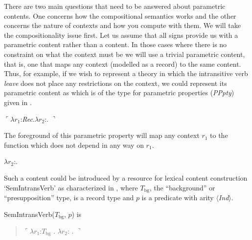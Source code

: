 There are two main questions that need to be answered about parametric
contents.  One concerns how the compositional semantics works and the
other concerns the nature of contexts and how you compute with them.
We will take the compositionality issue first.  Let us assume that all
signs provide us with a parametric content rather than a content.  In
those cases where there is no constraint on what the context must be
we will use a trivial parametric content, that is, one that maps any
context (modelled as a record) to the same content.  Thus, for
example, if we wish to represent a theory in which the intransitive
verb \textit{leave} does not place any restrictions on the context, we
could represent its parametric content as  which is of the
type for parametric properties (\textit{PPpty}) given in .
\begin{ex}
\begin{subex}
\item $\ulcorner\lambda r_1$:\textit{Rec}.$\lambda r_2$:.
$\urcorner$

\item {}
\end{subex}
\label{ex:parametricLeave}

\end{ex}
The foreground of this parametric property will map any context $r_1$ to the function \nexteg{} which does not depend in
any way on $r_1$.
\begin{ex} 
$\lambda r_2$:.
\end{ex} 
  
Such a content could be introduced by a resource for
lexical content construction `SemIntransVerb' as characterized in
\nexteg{}, where $T_{\mathrm{bg}}$, the
``background'' or ``presupposition'' type, is a record type and $p$ is a predicate with arity $\langle$\textit{Ind}$\rangle$.
\begin{ex} 
  SemIntransVerb($T_{\mathrm{bg}}$, $p$) is
  \begin{quote}
$\ulcorner\lambda r_1$:$T_{\mathrm{bg}}$ . $\lambda
r_2$:
. $\urcorner$
\end{quote}

\end{ex}


